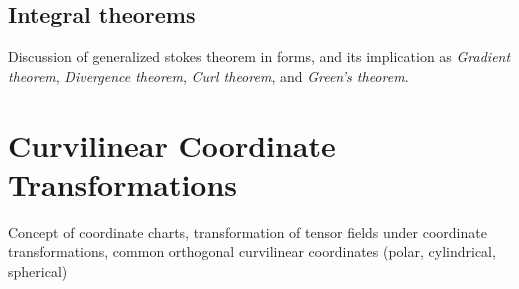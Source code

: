 \section{Integral theorems}
Discussion of generalized stokes theorem in forms, and its implication as \emph{Gradient theorem}, \emph{Divergence theorem}, \emph{Curl theorem}, and \emph{Green's theorem}.

\chapter{Curvilinear Coordinate Transformations}
Concept of coordinate charts, transformation of tensor fields under coordinate transformations, common orthogonal curvilinear coordinates (polar, cylindrical, spherical)
